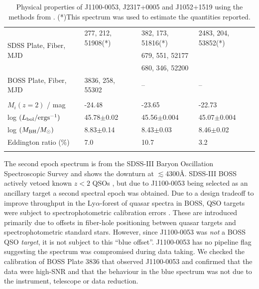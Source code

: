 \documentclass[11pt,a4paper]{article}
\begin{document}
\begin{table}[]
\begin{tabular}{l l l l}
    \multirow{3}{*}{SDSS Plate, Fiber, MJD }  &  	277, 212,   51908(*)    &  382, 173, 51816(*)         & 2483, 204, 53852(*) \\
    &                                           & 679, 551, 52177              & \\    
    &                                           & 680, 346, 52200             & \\
    BOSS Plate, Fiber, MJD                 & 	3836, 258, 55302          	    &    --                                & -- \\
    &&\\ 
    $M_{i}(z=2)$  / mag                          &   -24.48                             & -23.65                           & -22.73 \\
    log $(L_{\rm bol} / {\rm erg s}^{-1}) $  &   45.78$\pm$0.02               & 45.56$\pm$0.004      & 45.07$\pm$0.004 \\
    log $(M_{\rm BH} / M_{\odot})  $           &  8.83$\pm$0.14                & 8.43$\pm$0.03           & 8.46$\pm$0.02 \\
    Eddington ratio  (\%)                        &        7.0                         &  10.7                           &  3.2     \\ 
    &&\\
    \hline \hline 
  \end{tabular}
  \caption{Physical properties of J1100-0053, J2317+0005 and
    J1052+1519 using the methods from \citet{Shen2011}. (*)This spectrum
    was used to estimate the quantities reported.
} 
 \label{tab:Shen_props}
\end{table}

The second epoch spectrum is from the SDSS-III Baryon Oscillation
Spectroscopic Survey \citep[BOSS; ][]{Dawson2013} and shows the
downturn at $\lesssim$4300\AA. SDSS-III BOSS actively vetoed known
$z<2$ QSOs \citep{Ross2012}, but due to J1100-0053 being selected as
an ancillary target \citep[via a white dwarf program;][]{Kepler2015,
Kepler2016} a second spectral epoch was obtained. Due to a design
tradeoff to improve throughput in the Ly$\alpha$-forest of quasar
spectra in BOSS, QSO targets were subject to spectrophotometric
calibration errors \citep{Margala2016}. These are introduced primarily
due to offsets in fiber-hole positioning between quasar targets and
spectrophotometric standard stars. However, since J1100-0053 was {\it
not} a BOSS QSO {\it target}, it is not subject to this ``blue
offset''. J1100-0053 has no pipeline flag suggesting the spectrum was
compromised during data taking. We checked the calibration of BOSS
Plate 3836 that observed J1100-0053 and confirmed that the data were
high-SNR and that the behaviour in the blue spectrum was not due to
the instrument, telescope or data reduction.
\end{document}
